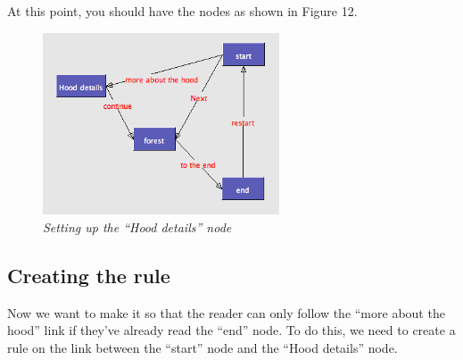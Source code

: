 \documentclass{article}
\begin{document}
At this point, you should have the nodes as shown in Figure 12.

 
\begin{figure}[ht]
  \centering
  \includegraphics[width=7cm]{images/hypedyn-tutorial-1-figure-12}
  \caption{\textit{Setting up the ``Hood details'' node}}
\end{figure} 

\subsection{Creating the rule}

Now we want to make it so that the reader can only follow the ``more about the
hood'' link if they've already read the ``end'' node. To do this, we need to
create a rule on the link between the ``start'' node and the ``Hood details'' node.
\end{document}
